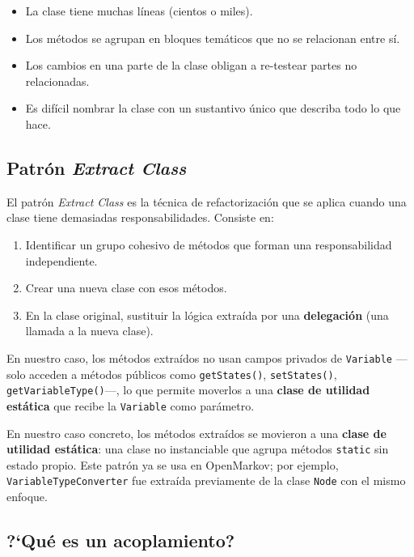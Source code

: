 \documentclass[11pt,a4paper]{article}
\newcommand{\code}[1]{\texttt{#1}}
\begin{document}
\begin{itemize}
  \item La clase tiene muchas l\'ineas (cientos o miles).
  \item Los m\'etodos se agrupan en bloques tem\'aticos que no se
        relacionan entre s\'i.
  \item Los cambios en una parte de la clase obligan a re-testear partes
        no relacionadas.
  \item Es dif\'icil nombrar la clase con un sustantivo \'unico que
        describa todo lo que hace.
\end{itemize}

\subsection{Patr\'on \emph{Extract Class}}

El patr\'on \emph{Extract Class} \cite{fowler2019} es la t\'ecnica de
refactorizaci\'on que se aplica cuando una clase tiene demasiadas
responsabilidades.  Consiste en:

\begin{enumerate}
  \item Identificar un grupo cohesivo de m\'etodos que forman una
        responsabilidad independiente.
  \item Crear una nueva clase con esos m\'etodos.
  \item En la clase original, sustituir la l\'ogica extra\'ida por una
        \textbf{delegaci\'on} (una llamada a la nueva clase).
\end{enumerate}

En nuestro caso, los m\'etodos extra\'idos no usan campos privados de
\code{Variable} ---solo acceden a m\'etodos p\'ublicos como
\code{getStates()}, \code{setStates()}, \code{getVariableType()}---,
lo que permite moverlos a una \textbf{clase de utilidad est\'atica} que
recibe la \code{Variable} como par\'ametro.

En nuestro caso concreto, los m\'etodos extra\'idos se movieron a una
\textbf{clase de utilidad est\'atica}: una clase no instanciable que
agrupa m\'etodos \code{static} sin estado propio.  Este patr\'on ya se
usa en OpenMarkov; por ejemplo, \code{VariableTypeConverter} fue
extra\'ida previamente de la clase \code{Node} con el mismo enfoque.

\subsection{?`Qu\'e es un acoplamiento?}
\label{sec:acoplamiento}
\end{document}
